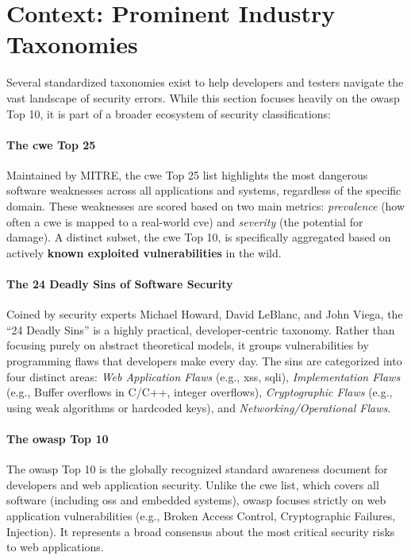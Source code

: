 \section{Context: Prominent Industry Taxonomies}
Several standardized taxonomies exist to help developers and testers navigate the vast landscape of security errors. While this section focuses heavily on the \gls{owasp} Top 10, it is part of a broader ecosystem of security classifications:

\paragraph{The \gls{cwe} Top 25} 
Maintained by MITRE, the \gls{cwe} Top 25 list highlights the most dangerous software weaknesses across all applications and systems, regardless of the specific domain. These weaknesses are scored based on two main metrics: \textit{prevalence} (how often a \gls{cwe} is mapped to a real-world \gls{cve}) and \textit{severity} (the potential for damage). A distinct subset, the \gls{cwe} Top 10, is specifically aggregated based on actively \textbf{known exploited vulnerabilities} in the wild.

\paragraph{The 24 Deadly Sins of Software Security} 
Coined by security experts Michael Howard, David LeBlanc, and John Viega, the ``24 Deadly Sins'' is a highly practical, developer-centric taxonomy. Rather than focusing purely on abstract theoretical models, it groups vulnerabilities by programming flaws that developers make every day. The sins are categorized into four distinct areas: \textit{Web Application Flaws} (e.g., \gls{xss}, \gls{sqli}), \textit{Implementation Flaws} (e.g., Buffer overflows in C/C++, integer overflows), \textit{Cryptographic Flaws} (e.g., using weak algorithms or hardcoded keys), and \textit{Networking/Operational Flaws}.

\paragraph{The \gls{owasp} Top 10} 
The \gls{owasp} Top 10 is the globally recognized standard awareness document for developers and web application security. Unlike the \gls{cwe} list, which covers all software (including \glspl{os} and embedded systems), \gls{owasp} focuses strictly on web application vulnerabilities (e.g., Broken Access Control, Cryptographic Failures, Injection). It represents a broad consensus about the most critical security risks to web applications.

